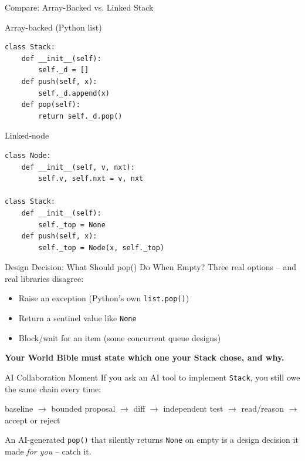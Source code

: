 \documentclass[aspectratio=169]{beamer}
\begin{document}
\begin{frame}[fragile]{Compare: Array-Backed vs. Linked Stack}
\begin{comparebody}
  \begin{compareleft}{Array-backed (Python list)}
\begin{lstlisting}
class Stack:
    def __init__(self):
        self._d = []
    def push(self, x):
        self._d.append(x)
    def pop(self):
        return self._d.pop()
\end{lstlisting}
  \end{compareleft}
  \begin{compareright}{Linked-node}
\begin{lstlisting}
class Node:
    def __init__(self, v, nxt):
        self.v, self.nxt = v, nxt

class Stack:
    def __init__(self):
        self._top = None
    def push(self, x):
        self._top = Node(x, self._top)
\end{lstlisting}
  \end{compareright}
\end{comparebody}
\end{frame}

\begin{designdecisionframe}{Design Decision: What Should pop() Do When Empty?}
  Three real options -- and real libraries disagree:
  \begin{itemize}
    \item Raise an exception (Python's own \texttt{list.pop()})
    \item Return a sentinel value like \texttt{None}
    \item Block/wait for an item (some concurrent queue designs)
  \end{itemize}
  \vspace{2mm}
  \textbf{Your World Bible must state which one your Stack chose, and why.}
\end{designdecisionframe}

\begin{aimomentframe}{AI Collaboration Moment}
  If you ask an AI tool to implement \texttt{Stack}, you still owe the
  same chain every time:

  \begin{center}
    \small baseline $\rightarrow$ bounded proposal $\rightarrow$ diff
    $\rightarrow$ independent test $\rightarrow$ read/reason
    $\rightarrow$ accept or reject
  \end{center}

  \vspace{2mm}
  An AI-generated \texttt{pop()} that silently returns \texttt{None} on
  empty is a design decision it made \emph{for you} -- catch it.
\end{aimomentframe}
\end{document}

